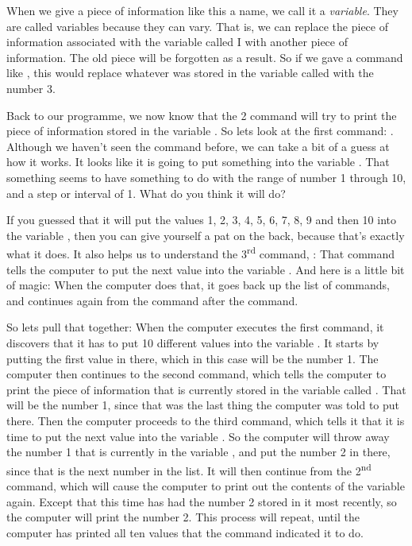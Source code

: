 When we give a piece of
information like this a name, we call it a {\em variable}.  They are called
variables because they can vary.  That is, we can replace the piece of information associated
with the variable called I with another piece of information.  The old piece will be forgotten
as a result.  So if we gave a command like , this would replace whatever was stored
in the variable called  with the number 3.

Back to our programme, we now know that the 2 command will try to print the piece of information
stored in the variable .  So lets look at the first command: .  Although
we haven't seen the  command before, we can take a bit of a guess at how it works. It looks like
it is going to put something into the variable .  That something seems to have something to do
with the range of number 1 through 10, and a step or interval of 1.  What do you think it will do?

If you guessed
that it will put the values 1, 2, 3, 4, 5, 6, 7, 8, 9 and then 10 into the variable , then you
can give yourself a pat on the back, because that's exactly what it does.  It also helps us to
understand the 3\textsuperscript{rd} command, : That command tells the computer to put the next value into
the variable .  And here is a little bit of magic: When the computer does that, it goes back
up the list of commands, and continues again from the command after the  command.

So lets pull that together: When the computer executes the first command, it discovers that it has
to put 10 different values into the variable . It starts by putting the first value in there, which
in this case will be the number 1.
The computer then continues to the second command, which tells the computer to print the piece of
information that is currently stored in the variable called . That will be the number 1, since
that was the last thing the computer was told to put there.  Then the computer proceeds to the
third command, which tells it that it is time to put the next value into the variable .  So the
computer will throw away the number 1 that is currently in the variable , and put the number 2 in
there, since that is the next number in the list.  It will then continue from the 2\textsuperscript{nd} command,
which will cause the computer to print out the contents of the variable  again.  Except that this
time  has had the number 2 stored in it most recently, so the computer will print the number 2.
This process will repeat, until the computer has printed all ten values that the  command
indicated it to do.   

